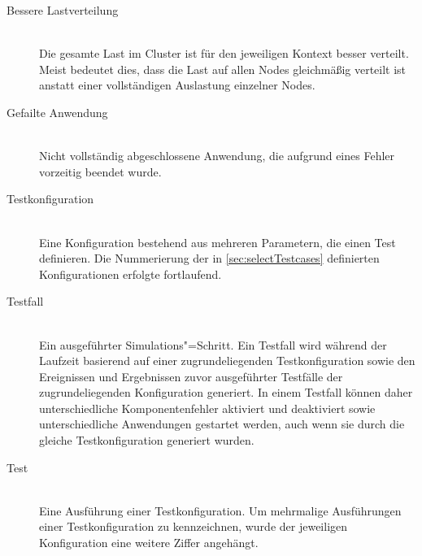 \begin{description}
    \item [Bessere Lastverteilung] \hfill \\
    Die gesamte Last im Cluster ist für den jeweiligen Kontext besser verteilt.
    Meist bedeutet dies, dass die Last auf allen Nodes gleichmäßig verteilt ist anstatt einer vollständigen Auslastung einzelner Nodes.
    \item [Gefailte Anwendung] \hfill \\
    Nicht vollständig abgeschlossene Anwendung, die aufgrund eines Fehler vorzeitig beendet wurde.
    \item [Testkonfiguration] \hfill \\
    Eine Konfiguration bestehend aus mehreren Parametern, die einen Test definieren.
    Die Nummerierung der in \autoref{sec:selectTestcases} definierten Konfigurationen erfolgte fortlaufend.
    \item [Testfall] \hfill \\
    Ein ausgeführter Simulations"=Schritt.
    Ein Testfall wird während der Laufzeit basierend auf einer zugrundeliegenden Testkonfiguration sowie den Ereignissen und Ergebnissen zuvor ausgeführter Testfälle der zugrundeliegenden Konfiguration generiert.
    In einem Testfall können daher unterschiedliche Komponentenfehler aktiviert und deaktiviert sowie unterschiedliche Anwendungen gestartet werden, auch wenn sie durch die gleiche Testkonfiguration generiert wurden.
    \item [Test] \hfill \\
    Eine Ausführung einer Testkonfiguration.
    Um mehrmalige Ausführungen einer Testkonfiguration zu kennzeichnen, wurde der jeweiligen Konfiguration eine weitere Ziffer angehängt.
\end{description}

















